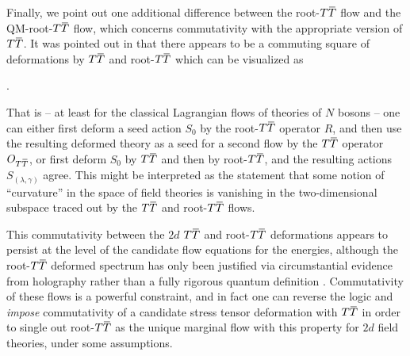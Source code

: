 \documentclass[12pt]{article}
\numberwithin{equation}{section}
\newcommand{\overbar}[1]{\mkern 1.5mu\overline{\mkern-1.5mu#1\mkern-1.5mu}\mkern 1.5mu}
\def\TT{{T\overbar{T}}}
\begin{document}
Finally, we point out one additional difference between the root-$\TT$ flow and the QM-root-$\TT$ flow, which concerns commutativity with the appropriate version of $\TT$. It was pointed out in \cite{Ferko:2022cix} that there appears to be a commuting square of deformations by $\TT$ and root-$\TT$ which can be visualized as
%
\begin{center}
 \; .
\end{center}
%
That is -- at least for the classical Lagrangian flows of theories of $N$ bosons -- one can either first deform a seed action $S_0$ by the root-$\TT$ operator $R$, and then use the resulting deformed theory as a seed for a second flow by the $\TT$ operator $O_{\TT}$, or first deform $S_0$ by $\TT$ and then by root-$\TT$, and the resulting actions $S_{(\lambda, \gamma)}$ agree. This might be interpreted as the statement that some notion of ``curvature'' in the space of field theories is vanishing in the two-dimensional subspace traced out by the $\TT$ and root-$\TT$ flows.

This commutativity between the $2d$ $\TT$ and root-$\TT$ deformations appears to persist at the level of the candidate flow equations for the energies, although the root-$\TT$ deformed spectrum has only been justified via circumstantial evidence from holography rather than a fully rigorous quantum definition \cite{Ebert:2023tih}. Commutativity of these flows is a powerful constraint, and in fact one can reverse the logic and \emph{impose} commutativity of a candidate stress tensor deformation with $\TT$ in order to single out root-$\TT$ as the unique marginal flow with this property for $2d$ field theories, under some assumptions.
\end{document}
